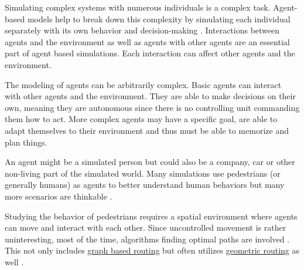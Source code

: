 	Simulating complex systems with numerous individuals is a complex task.
	Agent-based models help to break down this complexity by simulating each individual separately with its own behavior and decision-making \cite{macal-introductory-tutorial}.
	Interactions between agents and the environment as well as agents with other agents are an essential part of agent based simulations.
	Each interaction can affect other agents and the environment.
	
	The modeling of agents can be arbitrarily complex.
	Basic agents can interact with other agents and the environment.
	They are able to make decisions on their own, meaning they are autonomous since there is no controlling unit commanding them how to act.
	More complex agents may have a specific goal, are able to adapt themselves to their environment and thus must be able to memorize and plan things.
	
	An agent might be a simulated person but could also be a company, car or other non-living part of the simulated world.
	Many simulations use pedestrians (or generally humans) as agents to better understand human behaviors but many more scenarios are thinkable \cite{macal-introductory-tutorial}.

	Studying the behavior of pedestrians requires a spatial environment where agents can move and interact with each other.
	Since uncontrolled movement is rather uninteresting, most of the time, algorithms finding optimal paths are involved \cite{kneidl-borrmann-hartmann-navigation,gloor-hybrid-pedestrian-routing,teknomo-millonig-routing}.
	This not only includes \hyperref[sec:graph-routing]{graph based routing} but often utilizes \hyperref[sec:geometric-routing]{geometric routing} as well \cite{kneidl-borrmann-hartmann-navigation}.
	
